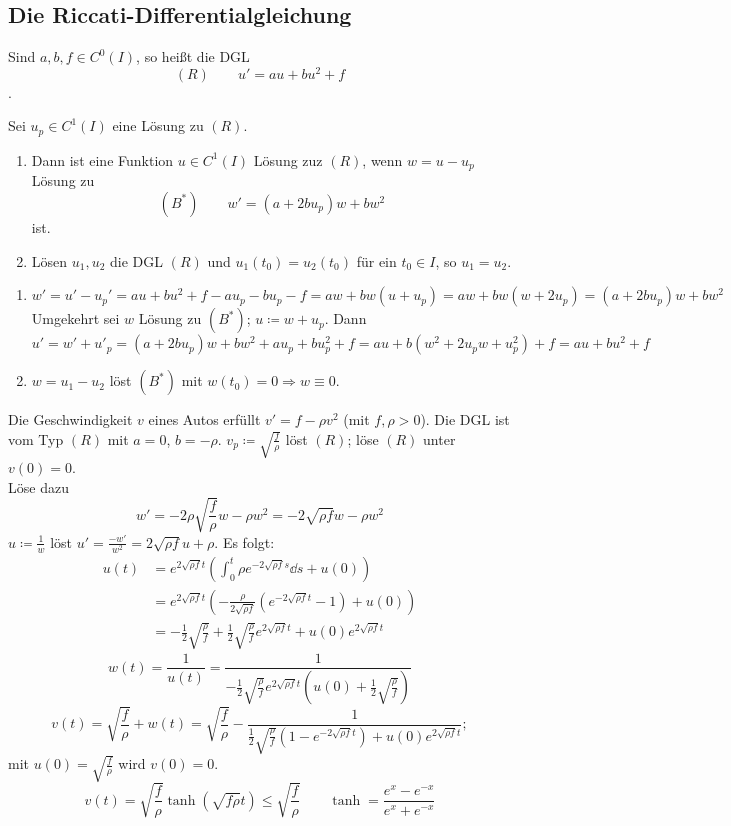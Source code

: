 \subsection{Die Riccati-Differentialgleichung}
Sind $ a,b,f\in C^0(I) $, so hei\ss t die DGL
\[ (R)\qquad u'=au+bu^2+f \]
.
\begin{lemma}
	Sei $ u_p\in C^1(I) $ eine L\"osung zu $ (R) $.
	\begin{enumerate}
		\item Dann ist eine Funktion $ u\in C^1(I) $ L\"osung zuz $ (R) $, wenn $ w=u-u_p $ L\"osung zu
		\[ (B^\ast)\qquad w'=(a+2bu_p)w+bw^2 \]
		ist.
		\item L\"osen $ u_1,u_2 $ die DGL $ (R) $ und $ u_1(t_0)=u_2(t_0) $ f\"ur ein $ t_0\in I $, so $ u_1=u_2 $.
	\end{enumerate}
\end{lemma}
\begin{beweis}
	\begin{enumerate}
		\item
	\[ w'=u'-u_p'=au+bu^2+f-au_p-bu_p-f=aw+bw(u+u_p)=aw+bw(w+2u_p)=(a+2bu_p)w+bw^2 \]
	Umgekehrt sei $ w $ L\"osung zu $ (B^\ast) $; $ u\coloneqq w+u_p $. Dann
	\[ u'=w'+u'_p=(a+2bu_p)w+bw^2+au_p+bu^2_p+f=au+b(w^2+2u_p w+u_p^2)+f=au+bu^2+f \]
	\item $ w=u_1-u_2 $ l\"ost $ (B^\ast) $ mit $ w(t_0)=0\Rightarrow w\equiv 0 $.
\end{enumerate}
\end{beweis}
\begin{beispiel*}
	Die Geschwindigkeit $ v $ eines Autos erf\"ullt $ v'=f-\rho v^2 $ (mit $ f,\rho>0 $). Die DGL ist vom Typ $ (R) $ mit $ a=0 $, $ b=-\rho $. $ v_p\coloneqq\sqrt{\frac{f}{\rho}} $ l\"ost $ (R) $; l\"ose $ (R) $ unter $ v(0)=0 $.\\
	L\"ose dazu \[ w'=-2\rho\sqrt{\frac{f}{\rho}}w-\rho w^2=-2\sqrt{\rho f}w-\rho w^2 \]
	$ u\coloneqq\frac{1}{w} $ l\"ost $ u'=\frac{-w'}{w^2}=2\sqrt{\rho f}u+\rho $. Es folgt:
	\begin{align*}
	u(t)&=e^{2\sqrt{\rho f}t}\left(\int_0^t\rho e^{-2\sqrt{\rho f}s}\dd s+u(0)\right)\\
	&=e^{2\sqrt{\rho f}t}\left(-\frac{\rho}{2\sqrt{\rho f}}\left(e^{-2\sqrt{\rho f}t}-1\right)+u(0)\right)\\
	&=-\frac{1}{2}\sqrt{\frac{\rho}{f}}+\frac{1}{2}\sqrt{\frac{\rho}{f}}e^{2\sqrt{\rho f}t}+u(0)e^{2\sqrt{\rho f}t}
	\end{align*}
	\[ w(t)=\frac{1}{u(t)}=\frac{1}{-\frac{1}{2}\sqrt{\frac{\rho}{f}}e^{2\sqrt{\rho f}t}\left(u(0)+\frac{1}{2}\sqrt{\frac{\rho}{f}}\right)} \]
	\[ v(t)=\sqrt{\frac{f}{\rho}}+w(t)=\sqrt{\frac{f}{\rho}}-\frac{1}{\frac{1}{2}\sqrt{\frac{\rho}{f}}\left(1-e^{-2\sqrt{\rho f}t}\right)+u(0)e^{2\sqrt{\rho f}t}}; \]
	mit $ u(0)=\sqrt{\frac{f}{\rho}} $ wird $ v(0)=0 $.
	\[ v(t)=\sqrt{\frac{f}{\rho}}\tanh(\sqrt{f\rho}t)\leq\sqrt{\frac{f}{\rho}}\qquad\tanh=\frac{e^x-e^{-x}}{e^x+e^{-x}} \]
\end{beispiel*}

